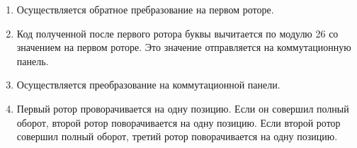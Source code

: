 \begin{enumerate}
	\item Осуществляется обратное пребразование на первом роторе.
	\item Код полученной после первого ротора буквы вычитается по модулю 26 со значением на первом роторе. Это значение отправляется на коммутационную панель.
	\item Осуществляется преобразование на коммутационной панели.
	\item Первый ротор проворачивается на одну позицию. Если он совершил полный оборот, второй ротор поворачивается на одну позицию. Если второй ротор совершил полный оборот, третий ротор поворачивается на одну позицию.
\end{enumerate}

%
